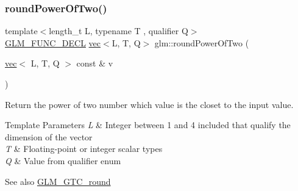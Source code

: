 \subsubsection{\texorpdfstring{round\+Power\+Of\+Two()}{roundPowerOfTwo()}\hspace{0.1cm}{\footnotesize\ttfamily [2/2]}}
{\footnotesize\ttfamily template$<$length\+\_\+t L, typename T , qualifier Q$>$ \\
\hyperlink{setup_8hpp_ab2d052de21a70539923e9bcbf6e83a51}{G\+L\+M\+\_\+\+F\+U\+N\+C\+\_\+\+D\+E\+CL} \hyperlink{structglm_1_1vec}{vec}$<$L, T, Q$>$ glm\+::round\+Power\+Of\+Two (\begin{DoxyParamCaption}\item[{\hyperlink{structglm_1_1vec}{vec}$<$ L, T, Q $>$ const \&}]{v }\end{DoxyParamCaption})}

Return the power of two number which value is the closet to the input value.


\begin{DoxyTemplParams}{Template Parameters}
{\em L} & Integer between 1 and 4 included that qualify the dimension of the vector \\
\hline
{\em T} & Floating-\/point or integer scalar types \\
\hline
{\em Q} & Value from qualifier enum\\
\hline
\end{DoxyTemplParams}
\begin{DoxySeeAlso}{See also}
\hyperlink{group__gtc__round}{G\+L\+M\+\_\+\+G\+T\+C\+\_\+round} 
\end{DoxySeeAlso}
